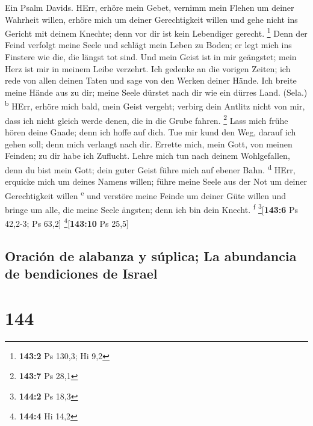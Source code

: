  Ein Psalm Davids. HErr, erhöre mein Gebet, vernimm mein
Flehen um deiner Wahrheit willen, erhöre mich um deiner Gerechtigkeit
willen  und gehe nicht ins Gericht mit deinem Knechte;
denn vor dir ist kein Lebendiger gerecht. \footnote{\textbf{143:2} Ps
  130,3; Hi 9,2}  Denn der Feind verfolgt meine Seele und
schlägt mein Leben zu Boden; er legt mich ins Finstere wie die, die
längst tot sind.  Und mein Geist ist in mir geängstet;
mein Herz ist mir in meinem Leibe verzehrt.  Ich gedenke
an die vorigen Zeiten; ich rede von allen deinen Taten und sage von den
Werken deiner Hände.  Ich breite meine Hände aus zu dir;
meine Seele dürstet nach dir wie ein dürres Land. (Sela.)
\textsuperscript{b}  HErr, erhöre mich bald, mein Geist
vergeht; verbirg dein Antlitz nicht von mir, dass ich nicht gleich werde
denen, die in die Grube fahren. \footnote{\textbf{143:7} Ps 28,1}
 Lass mich frühe hören deine Gnade; denn ich hoffe auf
dich. Tue mir kund den Weg, darauf ich gehen soll; denn mich verlangt
nach dir.  Errette mich, mein Gott, von meinen Feinden; zu
dir habe ich Zuflucht.  Lehre mich tun nach deinem
Wohlgefallen, denn du bist mein Gott; dein guter Geist führe mich auf
ebener Bahn. \textsuperscript{d}  HErr, erquicke mich um
deines Namens willen; führe meine Seele aus der Not um deiner
Gerechtigkeit willen \textsuperscript{e}  und verstöre
meine Feinde um deiner Güte willen und bringe um alle, die meine Seele
ängsten; denn ich bin dein Knecht. \textsuperscript{f}
\footnote{\textbf{144:2} Ps 18,3}{[}\textbf{143:6} Ps 42,2-3; Ps 63,2{]}
\footnote{\textbf{144:4} Hi 14,2}{[}\textbf{143:10} Ps 25,5{]}

\hypertarget{oraciuxf3n-de-alabanza-y-suxfaplica-la-abundancia-de-bendiciones-de-israel}{%
\subsection{Oración de alabanza y súplica; La abundancia de bendiciones
de
Israel}\label{oraciuxf3n-de-alabanza-y-suxfaplica-la-abundancia-de-bendiciones-de-israel}}

\hypertarget{section-143}{%
\section{144}\label{section-143}}

